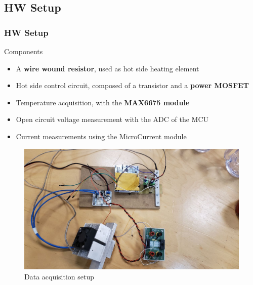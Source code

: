 \subsection{HW Setup}
\begin{frame}
    \frametitle{HW Setup}
    
\begin{block}{Components}
    \begin{itemize}
        \item A \textbf{wire wound resistor}, used as hot side heating element
        \item Hot side control circuit, composed of a transistor and a \textbf{power MOSFET}
        \item Temperature acquisition, with the \textbf{MAX6675 module}
        \item Open circuit voltage measurement with the ADC of the MCU
        \item Current measurements using the MicroCurrent module
    \end{itemize}
\end{block}

\begin{figure}
        \centering
        \includegraphics[scale=0.15]{images/tegsetup.jpg}
        \caption{Data acquisition setup}
    \end{figure}
\end{frame}

